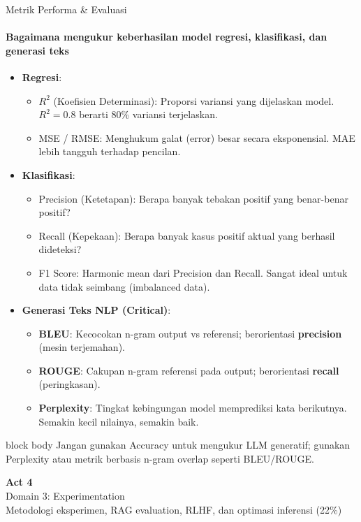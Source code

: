 \documentclass[aspectratio=169,t]{beamer}
\newcommand{\acttitle}[3]{%
  \begin{frame}[plain]
    \vspace{1.5cm}
    \begin{center}
      {\color{nvgreen}\Huge\bfseries Act #1}\\[1.2em]
      {\color{nvwhite}\Huge #2}\\[0.8em]
      {\color{nvgray}\Large #3}
    \end{center}
  \end{frame}%
}
\newcommand{\takeaway}[1]{%
  \vspace{0.1em}
  \begin{beamercolorbox}[rounded=true,shadow=false,sep=5pt]{block body}
    \centering\footnotesize\color{nvlightgreen}#1
  \end{beamercolorbox}%
}
\begin{document}
\begin{frame}{Metrik Performa \& Evaluasi}
  \framesubtitle{Bagaimana mengukur keberhasilan model regresi, klasifikasi, dan generasi teks}
  \begin{itemize}\scriptsize
    \item \textbf{Regresi}:
      \begin{itemize}\scriptsize
        \item $R^2$ (Koefisien Determinasi): Proporsi variansi yang dijelaskan model. $R^2 = 0.8$ berarti 80\% variansi terjelaskan.
        \item MSE / RMSE: Menghukum galat (error) besar secara eksponensial. MAE lebih tangguh terhadap pencilan.
      \end{itemize}
    \item \textbf{Klasifikasi}:
      \begin{itemize}\scriptsize
        \item Precision (Ketetapan): Berapa banyak tebakan positif yang benar-benar positif?
        \item Recall (Kepekaan): Berapa banyak kasus positif aktual yang berhasil dideteksi?
        \item F1 Score: Harmonic mean dari Precision dan Recall. Sangat ideal untuk data tidak seimbang (imbalanced data).
      \end{itemize}
    \item \textbf{Generasi Teks NLP (Critical)}:
      \begin{itemize}\scriptsize
        \item \textbf{BLEU}: Kecocokan n-gram output vs referensi; berorientasi \textbf{precision} (mesin terjemahan).
        \item \textbf{ROUGE}: Cakupan n-gram referensi pada output; berorientasi \textbf{recall} (peringkasan).
        \item \textbf{Perplexity}: Tingkat kebingungan model memprediksi kata berikutnya. Semakin kecil nilainya, semakin baik.
      \end{itemize}
  \end{itemize}
  \takeaway{Jangan gunakan Accuracy untuk mengukur LLM generatif; gunakan Perplexity atau metrik berbasis n-gram overlap seperti BLEU/ROUGE.}
\end{frame}

\acttitle{4}{Domain 3: Experimentation}{Metodologi eksperimen, RAG evaluation, RLHF, dan optimasi inferensi (22\%)}
\end{document}
